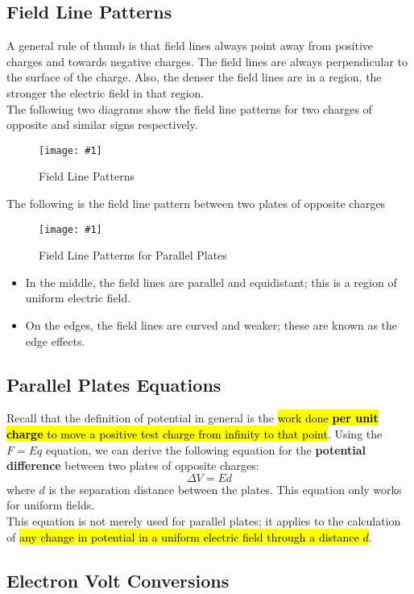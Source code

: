 \documentclass[a4paper,12pt]{article}
\newcommand{\lb}{\\[8pt]}
\newcommand{\img}[4]{\begin{center}
  \begin{figure}[H]
    \centering
    \texttt{[image: \#1]}
    \caption{#3}
    \label{fig:#4}
  \end{figure}
\end{center}}
\begin{document}
\pagebreak

\subsection{Field Line Patterns}

A general rule of thumb is that field lines always point away from positive charges and towards negative charges. The field lines are always perpendicular to the surface of the charge. Also, the denser the field lines are in a region, the stronger the electric field in that region.\lb
The following two diagrams show the field line patterns for two charges of opposite and similar signs respectively.
\img{fieldlines.jpg}{0.8}{Field Line Patterns}{fieldlines}

The following is the field line pattern between two plates of opposite charges
\img{plates.jpeg}{0.4}{Field Line Patterns for Parallel Plates}{plates}
\begin{itemize}
  \item In the middle, the field lines are parallel and equidistant; this is a region of uniform electric field.
  \item On the edges, the field lines are curved and weaker;  these are known as the edge effects.
\end{itemize}

\subsection{Parallel Plates Equations}

Recall that the definition of potential in general is the \hl{work done \textbf{per unit charge} to move a positive test charge from infinity to that point}. Using the $F = Eq$ equation, we can derive the following equation for the \textbf{potential difference} between two plates of opposite charges:
\begin{equation}\label{eq:plates}
  \Delta V = Ed
\end{equation}
where $d$ is the separation distance between the plates. This equation only works for uniform fields.\lb
This equation is not merely used for parallel plates; it applies to the calculation of \hl{any change in potential in a uniform electric field through a distance $d$}.

\subsection{Electron Volt Conversions}
\end{document}

